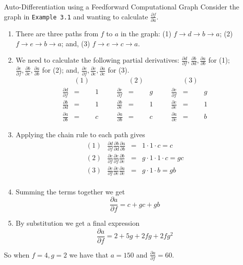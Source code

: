 \documentclass[11pt,a4paper]{article}
\begin{document}
\begin{example}{Auto-Differentiation using a Feedforward Computational Graph}
  Consider the graph in \texttt{Example 3.1} and wanting to calculate $\frac{\partial f}{\partial a}$.
  \begin{enumerate}
    \item There are three paths from $f$ to $a$ in the graph: (1) $f\to d\to b\to a$; (2) $f\to e\to b\to a$; and, (3) $f\to e\to c\to a$.
    \item We need to calculate the following partial derivatives: $\frac{\partial d}{\partial f},\frac{\partial b}{\partial d},\frac{\partial a}{\partial b}$ for (1); $\frac{\partial e}{\partial f},\frac{\partial b}{\partial e},\frac{\partial a}{\partial b}$ for (2); and, $\frac{\partial e}{\partial f},\frac{\partial c}{\partial e},\frac{\partial a}{\partial c}$ for (3).
    \[\begin{array}{rclcrclcrcl}
      &(1)&&&&(2)&&&&(3)\\
      \frac{\partial d}{\partial f}&=&1&\quad&\frac{\partial e}{\partial f}&=&g&\quad&\frac{\partial e}{\partial f}&=&g\\
      \frac{\partial b}{\partial d}&=&1&\quad&\frac{\partial b}{\partial e}&=&1&\quad&\frac{\partial c}{\partial e}&=&1\\
      \frac{\partial a}{\partial b}&=&c&\quad&\frac{\partial a}{\partial b}&=&c&\quad&\frac{\partial a}{\partial c}&=&b
    \end{array}\]
    \item Applying the chain rule to each path gives
    \[\begin{array}{rrcl}
      (1)&\frac{\partial d}{\partial f}\frac{\partial b}{\partial d}\frac{\partial a}{\partial b}&=&1\cdot1\cdot c=c\\
      (2)&\frac{\partial e}{\partial f}\frac{\partial e}{\partial f}\frac{\partial b}{\partial e}&=&g\cdot1\cdot1\cdot c=gc\\
      (3)&\frac{\partial e}{\partial f}\frac{\partial c}{\partial e}\frac{\partial a}{\partial c}&=&g\cdot1\cdot b=gb\\
    \end{array}\]
    \item Summing the terms together we get
    \[ \frac{\partial a}{\partial f}=c+gc+gb \]
    \item By substitution we get a final expression
    \[ \frac{\partial a}{\partial f}=2+5g+2fg+2fg^2 \]
  \end{enumerate}
  So when $f=4,g=2$ we have that $a=150$ and $\frac{\partial a}{\partial f}=60$.
\end{example}
\end{document}
